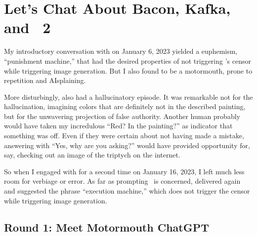 
\newpage
\section{Let's Chat About Bacon, Kafka, and \DALLE~2}
\label{adx:chatgpt}

My introductory conversation with \ChatGPT{} on January 6, 2023 yielded a
euphemism, ``punishment machine,'' that had the desired properties of not
triggering \DALLE's censor while triggering image generation. But I also found
\ChatGPT{} to be a motormouth, prone to repetition and AIsplaining.

More disturbingly, \ChatGPT{} also had a hallucinatory episode. It was
remarkable not for the hallucination, imagining colors that are definitely not
in the described painting, but for the unwavering projection of false authority.
Another human probably would have taken my incredulous ``Red? In the painting?''
as indicator that something was off. Even if they were certain about not having
made a mistake, answering with ``Yes, why are you asking?'' would have provided
opportunity for, say, checking out an image of the triptych on the internet.

So when I engaged with \ChatGPT{} for a second time on January 16, 2023, I left
much less room for verbiage or error. As far as prompting \DALLE\ is concerned,
\ChatGPT{} delivered again and suggested the phrase ``execution machine,'' which
does not trigger the censor while triggering image generation.


\subsection{Round 1: Meet Motormouth ChatGPT}

